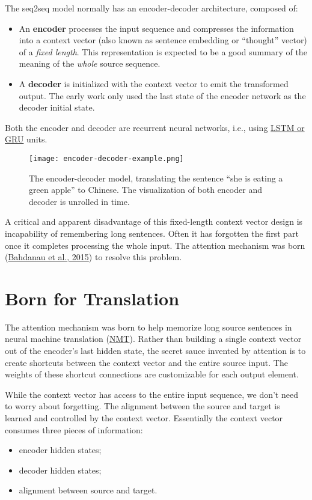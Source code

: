 \documentclass[12pt]{article}
\begin{document}
The seq2seq model normally has an encoder-decoder architecture, composed of:
\begin{itemize}
    \item An \textbf{encoder} processes the input sequence and compresses the information into a context vector (also known as sentence embedding or ``thought'' vector) of a \emph{fixed length}. This representation is expected to be a good summary of the meaning of the \emph{whole} source sequence.
    \item A \textbf{decoder} is initialized with the context vector to emit the transformed output. The early work only used the last state of the encoder network as the decoder initial state.
\end{itemize}
Both the encoder and decoder are recurrent neural networks, i.e., using \href{http://colah.github.io/posts/2015-08-Understanding-LSTMs/}{LSTM or GRU} units.

\begin{figure}[H]
    \centering
    \texttt{[image: encoder-decoder-example.png]}
    \caption{The encoder-decoder model, translating the sentence ``she is eating a green apple'' to Chinese. The visualization of both encoder and decoder is unrolled in time.}
\end{figure}

A critical and apparent disadvantage of this fixed-length context vector design is incapability of remembering long sentences. Often it has forgotten the first part once it completes processing the whole input. The attention mechanism was born (\href{https://arxiv.org/pdf/1409.0473.pdf}{Bahdanau et al., 2015}) to resolve this problem.

\section{Born for Translation}
The attention mechanism was born to help memorize long source sentences in neural machine translation (\href{https://arxiv.org/pdf/1409.0473.pdf}{NMT}). Rather than building a single context vector out of the encoder’s last hidden state, the secret sauce invented by attention is to create shortcuts between the context vector and the entire source input. The weights of these shortcut connections are customizable for each output element.

While the context vector has access to the entire input sequence, we don’t need to worry about forgetting. The alignment between the source and target is learned and controlled by the context vector. Essentially the context vector consumes three pieces of information:
\begin{itemize}
    \item encoder hidden states;
    \item decoder hidden states;
    \item alignment between source and target.
\end{itemize}
\end{document}
